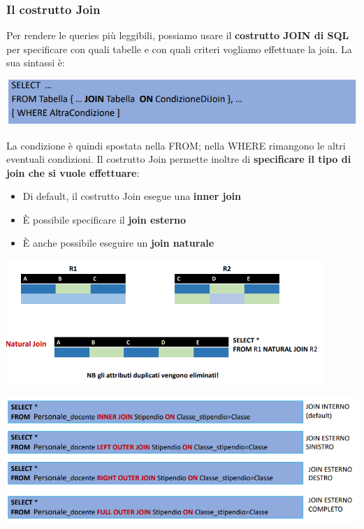 \documentclass[12pt]{article}
\begin{document}
\subsubsection{Il costrutto Join}
Per rendere le queries più leggibili, possiamo usare il \textbf{costrutto JOIN di SQL} per specificare con quali tabelle e con quali criteri vogliamo effettuare la join.
La sua sintassi è:
\begin{center}
    \includegraphics[width = 1\textwidth]{Images/199.PNG}
\end{center}
La condizione è quindi spostata nella FROM; nella WHERE rimangono le altri eventuali condizioni.
Il costrutto Join permette inoltre di \textbf{specificare il tipo di join che si vuole effettuare}:
\begin{itemize}
    \item Di default, il costrutto Join esegue una \textbf{inner join}
    \item È possibile specificare il \textbf{join esterno}
    \item È anche possibile eseguire un \textbf{join naturale}
\end{itemize}
\begin{center}
    \includegraphics[width = 0.90\textwidth]{Images/200.PNG}
\end{center}
\begin{center}
    \includegraphics[width = 1.15\textwidth]{Images/201.PNG}
\end{center}
\end{document}
